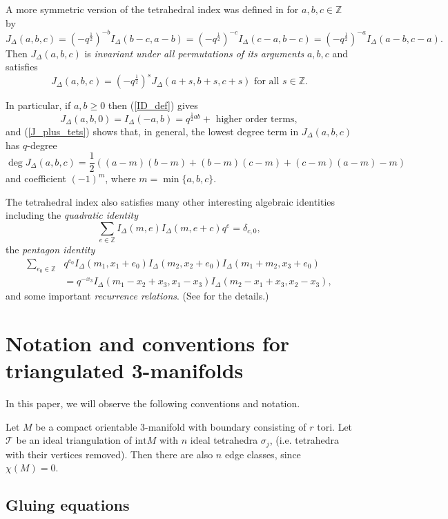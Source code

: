 \documentclass[12pt,reqno]{amsart}  %
\theoremstyle{definition}
\theoremstyle{remark}
\def\tri{\mathcal{T}}
\def\BZ{\mathbb Z}
\def\be{  \begin{equation} }
\def\ee{  \end{equation} }
\def\ID{I_{\Delta}}
\def\Z{\mathbb Z}
\def\JD{J_{\Delta}}
\begin{document}
\medskip
A more symmetric version of the tetrahedral index was defined in \cite{GHRS}  
 for $a,b,c \in \Z$ by
\be
\JD(a,b,c)= (-q^{\frac{1}{2}})^{-b} \ID(b-c,a-b)
= (-q^{\frac{1}{2}})^{-c} \ID(c-a,b-c) = (-q^{\frac{1}{2}})^{-a} \ID(a-b,c-a).
\ee
Then $\JD(a,b,c)$ is \emph{invariant under all permutations of its 
arguments} $a,b,c$ and satisfies
\be
\JD(a,b,c) = (-q^{\frac{1}{2}})^{s} \JD(a+s,b+s,c+s)  
\text{ for all } s \in \Z.
\label{J_plus_tets}
\ee

In particular, if $a, b\ge 0$ then (\ref{ID_def}) gives 
\be
\JD(a,b,0) =\ID(-a,b) = q^{\frac{1}{2}ab} + \text{ higher order terms},
\label{min_j_deg}
\ee
and (\ref{J_plus_tets}) shows that, in general, the lowest degree term 
in $\JD(a,b,c)$ has $q$-degree 
\be
\deg \JD(a,b,c) = 
\frac{1}{2}\left( (a-m)(b-m) +(b-m)(c-m)+(c-m)(a-m) - m \right) 
\ee
and coefficient $(-1)^m$,  where $m=\min\{a,b,c\}$.

The tetrahedral index also satisfies many other interesting algebraic 
identities including the \emph{quadratic identity} 
\be
\label{eq.IDquadratic}
\sum_{e \in \BZ} \ID(m,e)\ID(m,e+c)q^e =\delta_{c,0},
\ee
the \emph{pentagon identity}
\begin{align}
\sum_{e_0 \in \BZ}
& q^{e_0} \ID(m_1,x_1+e_0)\ID(m_2,x_2+e_0)\ID(m_1+m_2,x_3+e_0)
\label{pent_eq} \\
&=q^{-x_3} \ID(m_1-x_2+x_3,x_1-x_3)\ID(m_2-x_1+x_3,x_2-x_3) ,\nonumber
\end{align}
and some important {\em recurrence relations}. 
(See \cite{Gar} for the details.)


\section{Notation and conventions for triangulated 3-manifolds}

In this paper, we will observe the following conventions and notation. 

Let $M$ be a compact orientable 3-manifold with boundary consisting of 
$r$ tori. Let $\tri$ be an ideal triangulation of $\text{int} M$ with 
$n$ ideal tetrahedra $\sigma_j$, (i.e. tetrahedra with their vertices 
removed). Then there are also $n$ edge classes, since $\chi(M)=0$.  

\subsection{Gluing equations} 
\label{gluing_eqn_sect}
\end{document}
